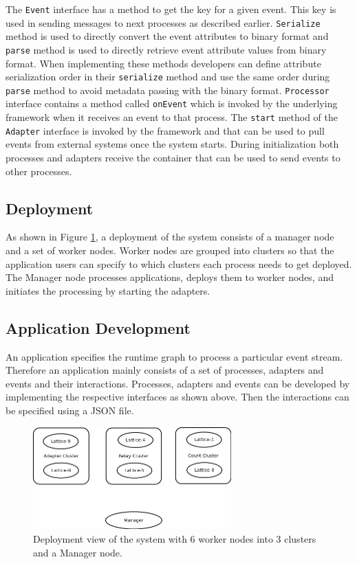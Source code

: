  The \texttt{Event} interface has a method to get the key for a given event. This key is used in sending messages to next processes as described earlier. \texttt{Serialize} method is used to directly convert the event attributes to binary format and \texttt{parse} method is used to directly retrieve event attribute values from binary format. When implementing these methods developers can define attribute serialization order in their \texttt{serialize} method and use the same order during \texttt{parse} method to avoid metadata passing with the binary format. \texttt{Processor} interface contains a method called \texttt{onEvent} which is invoked by the underlying framework when it receives an event to that process. The \texttt{start} method of the \texttt{Adapter} interface is invoked by the framework and that can be used to pull events from external systems once the system starts. During initialization both processes and adapters receive the container that can be used to send events to other processes.
 
 \subsection{Deployment}

As shown in Figure \ref{deployment}, a deployment of the system consists of a manager node and a set of worker nodes. Worker nodes are grouped into clusters so that the application users can specify to which clusters each process needs to get deployed. The Manager node processes applications, deploys them to worker nodes, and initiates the processing by starting the adapters.

\subsection{Application Development}

An application specifies the runtime graph to process a particular event stream. Therefore an application mainly consists of a set of processes, adapters and events and their interactions. Processes, adapters and events can be developed by implementing the respective interfaces as shown above. Then the interactions can be specified using a JSON file. 

\clearpage

\begin{figure}[!t]
        \centering
        \includegraphics[width=3.0in]{deployment.png}
        \caption{Deployment view of the system with 6 worker nodes into 3 clusters and a Manager node.}
        \label{deployment}
\end{figure}



